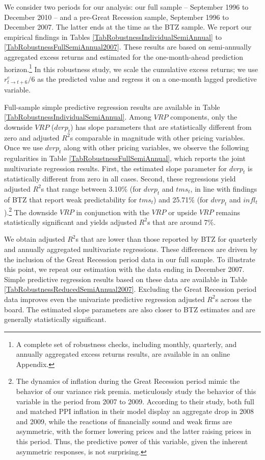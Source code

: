 \documentclass[11pt]{article}
\begin{document}
We consider two periods for our analysis: our full sample -- September 1996 to December 2010 -- and a pre-Great Recession sample, September 1996 to December 2007. The latter ends at the time as the BTZ sample. We report our empirical findings in Tables \ref{TabRobustnessIndividualSemiAnnual} to \ref{TabRobustnessFullSemiAnnual2007}. These results are based on semi-annually aggregated excess returns and estimated for the one-month-ahead prediction horizon.\footnote{A complete set of robustness checks, including monthly, quarterly, and annually aggregated excess returns results, are available in an online Appendix.} In this robustness study, we scale the cumulative excess returns; we use $r^e_{t\rightarrow t+6}/6$ as the predicted value and regress it on a one-month lagged predictive variable.

Full-sample simple predictive regression results are available in Table \ref{TabRobustnessIndividualSemiAnnual}. Among $VRP$ components, only the downside $VRP$ ($dvrp_t$) has slope parameters that are statistically different from zero and adjusted $R^2$s comparable in magnitude with other pricing variables. Once we use $dvrp_t$ along with other pricing variables, we observe the following regularities in Table \ref{TabRobustnessFullSemiAnnual}, which reports the joint multivariate regression results. First, the estimated slope parameter for $dvrp_t$ is statistically different from zero in all cases. Second, these regressions yield adjusted $R^2$s that range between 3.10\% (for $dvrp_t$ and $tms_t$, in line with findings of BTZ that report weak predictability for $tms_t$) and 25.71\% (for $dvrp_t$ and $infl_t$).\footnote{The dynamics of inflation during the Great Recession period mimic the behavior of our variance risk premia. \cite{GSSZ14WP} meticulously study the behavior of this variable in the period from 2007 to 2009.  According to their study, both full and matched PPI inflation in their model display an aggregate drop in 2008 and 2009, while the reactions of financially sound and weak firms are asymmetric, with the former lowering prices and the latter raising prices in this period. Thus, the predictive power of this variable, given the inherent asymmetric responses, is not surprising.} The downside $VRP$ in conjunction with the $VRP$ or upside $VRP$ remains statistically significant and yields adjusted $R^2$s that are around 7\%.

We obtain adjusted $R^2$s that are lower than those reported by BTZ for quarterly and annually aggregated multivariate regressions. These differences are driven by the inclusion of the Great Recession period data in our full sample. To illustrate this point, we repeat our estimation with the data ending in December 2007. Simple predictive regression results based on these data are available in Table \ref{TabRobustnessReducedSemiAnnual2007}. Excluding the Great Recession period data improves even the univariate predictive regression adjusted $R^2$s across the board. The estimated slope parameters are also closer to BTZ estimates and are generally statistically significant.
\end{document}
